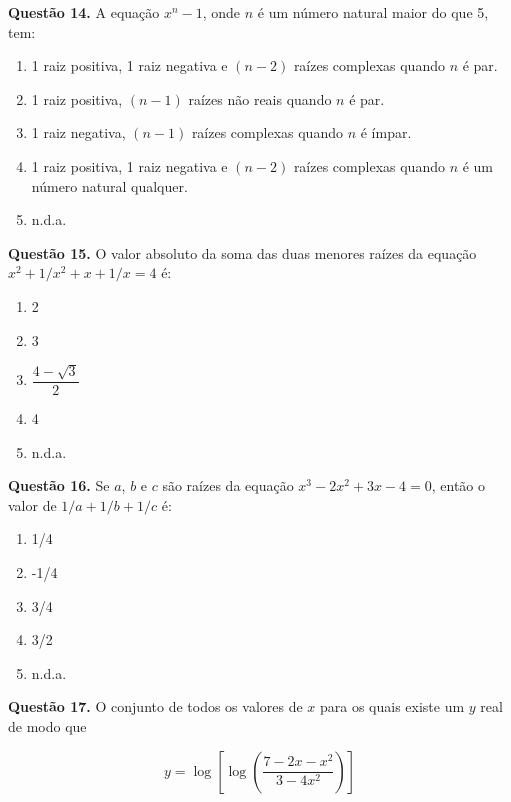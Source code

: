 \documentclass[11pt]{article}
\begin{document}
\textbf{Questão 14.} A equação $x^n - 1$, onde $n$ é um número natural maior do que 5, tem:

\begin{enumerate}[\bf A (\quad)]
    \item 1  raiz  positiva,  1  raiz  negativa  e  $(n - 2)$  raízes  complexas quando $n$ é par. 
    \item 1 raiz positiva, $(n - 1)$ raízes não reais quando $n$ é par. 
    \item 1  raiz  negativa,  $(n - 1)$  raízes  complexas  quando  $n$  é  ímpar.
    \item 1  raiz  positiva,  1  raiz  negativa  e  $(n - 2)$  raízes  complexas quando $n$ é um número natural qualquer. 
    \item n.d.a.
\end{enumerate}

\textbf{Questão 15.} O valor absoluto da soma das duas menores raízes da equação $x^2 + 1 / x^2 + x + 1 / x = 4$ é:

\begin{multicols}{5}
\begin{enumerate}[\bf A (\quad)]
    \item 2
    \item 3
    \item $\dfrac{4-\sqrt{3}}{2}$
    \item 4
    \item n.d.a.
\end{enumerate}
\end{multicols}

\textbf{Questão 16.} Se $a$, $b$ e $c$ são raízes da equação $x^3 - 2x^2 + 3x - 4 = 0$, então o valor de $1 / a + 1 / b+ 1 / c$ é:

\begin{multicols}{5}
    \begin{enumerate}[\bf A (\quad)]
        \item 1/4
        \item -1/4
        \item 3/4
        \item 3/2
        \item n.d.a.
    \end{enumerate}
\end{multicols}

\textbf{Questão 17.} O  conjunto  de  todos  os  valores  de  $x$  para  os  quais  existe um $y$ real de modo que

$$
y = \log \left[ \log \left( \frac{7 - 2x - x^2}{3 - 4x^2} \right) \right]
$$
\end{document}
